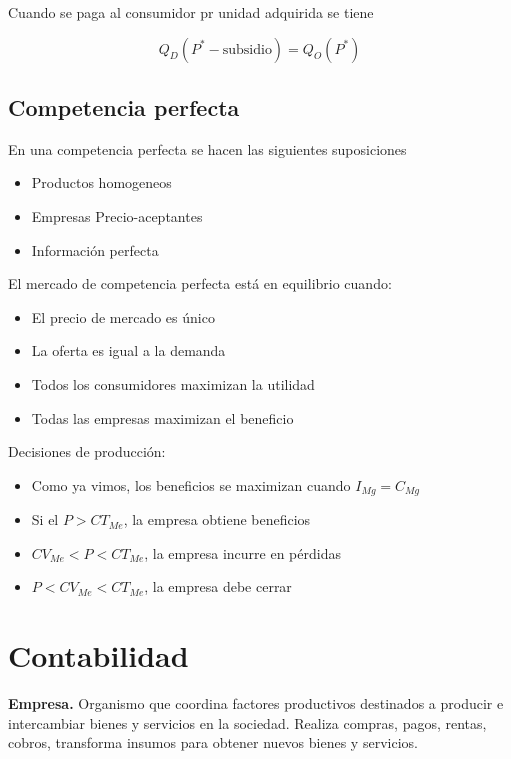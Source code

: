 \documentclass[twocolumn,10pt]{article}
\begin{document}
Cuando se paga al consumidor pr unidad adquirida se tiene

\[
Q_D(P^{*}-\text{subsidio}) = Q_O(P^{*}) 
\]

\subsection{Competencia perfecta}
En una competencia perfecta se hacen las siguientes suposiciones
\begin{itemize}
	\item Productos homogeneos
	\item Empresas Precio-aceptantes
	\item Información perfecta
\end{itemize}

El mercado de competencia perfecta está en equilibrio cuando:


\begin{itemize}
	\item El precio de mercado es único
	\item La oferta es igual a la demanda
	\item Todos los consumidores maximizan la utilidad
	\item Todas las empresas maximizan el beneficio
\end{itemize}

Decisiones de producción:
\begin{itemize}
	\item Como ya vimos, los beneficios se maximizan cuando $I_{Mg}=C_{Mg}$
	\item Si el $P>CT_{Me}$, la empresa obtiene beneficios
	\item $CV_{Me}<P<CT_{Me}$, la empresa incurre en pérdidas
	\item $P<CV_{Me}<CT_{Me}$, la empresa debe cerrar
\end{itemize}
\section{Contabilidad}

\textbf{Empresa.} Organismo que coordina factores productivos destinados a producir e intercambiar bienes y servicios en la sociedad. Realiza compras, pagos, rentas, cobros, transforma insumos para obtener nuevos bienes y servicios. 
\end{document}
